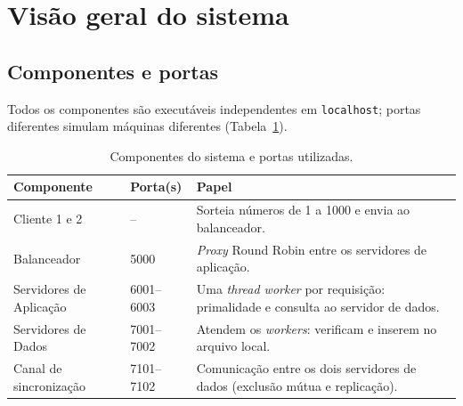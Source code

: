 \documentclass[11pt,a4paper]{article}
\begin{document}
\section{Visão geral do sistema}
\label{sec:arquitetura}

\subsection{Componentes e portas}

Todos os componentes são executáveis independentes em \texttt{localhost}; portas
diferentes simulam máquinas diferentes (Tabela~\ref{tab:portas}).

\begin{table}[H]
\centering
\caption{Componentes do sistema e portas utilizadas.}
\label{tab:portas}
\begin{tabular}{@{}llp{7.2cm}@{}}
\toprule
\textbf{Componente} & \textbf{Porta(s)} & \textbf{Papel} \\
\midrule
Cliente 1 e 2           & --          & Sorteia números de 1 a 1000 e envia ao balanceador. \\
Balanceador             & 5000        & \emph{Proxy} Round Robin entre os servidores de aplicação. \\
Servidores de Aplicação & 6001--6003  & Uma \emph{thread worker} por requisição: primalidade e consulta ao servidor de dados. \\
Servidores de Dados     & 7001--7002  & Atendem os \emph{workers}: verificam e inserem no arquivo local. \\
Canal de sincronização  & 7101--7102  & Comunicação entre os dois servidores de dados (exclusão mútua e replicação). \\
\bottomrule
\end{tabular}
\end{table}
\end{document}
